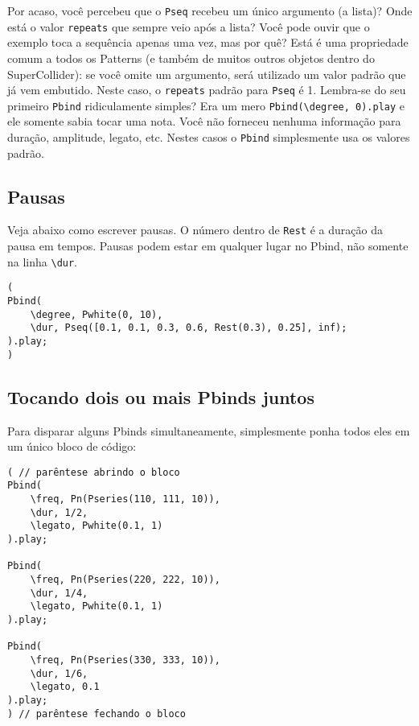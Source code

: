 Por acaso, você percebeu que o \texttt{Pseq} recebeu um único argumento (a lista)? Onde está o valor \texttt{repeats} que sempre veio após a lista? Você pode ouvir que o exemplo toca a sequência apenas uma vez, mas por quê? Está é uma propriedade comum a todos os Patterns (e também de muitos outros objetos dentro do SuperCollider): se você omite um argumento, será utilizado um valor padrão que já vem embutido. Neste caso, o \texttt{repeats} padrão para \texttt{Pseq} é 1. Lembra-se do seu primeiro \texttt{Pbind} ridiculamente simples? Era um mero \texttt{Pbind(\textbackslash degree, 0).play} e ele somente sabia tocar uma nota. Você não forneceu nenhuma informação para duração, amplitude, legato, etc. Nestes casos o \texttt{Pbind} simplesmente usa os valores padrão.


\subsection{Pausas}

Veja abaixo como escrever pausas. O número dentro de \texttt{Rest} é a duração da pausa em tempos. Pausas podem estar em qualquer lugar no Pbind, não somente na linha \texttt{\textbackslash dur}.

 
\begin{lstlisting}[style=SuperCollider-IDE, basicstyle=\scttfamily\footnotesize]
(
Pbind(
	\degree, Pwhite(0, 10),
	\dur, Pseq([0.1, 0.1, 0.3, 0.6, Rest(0.3), 0.25], inf);
).play;
)
\end{lstlisting}
 

\subsection{Tocando dois ou mais Pbinds juntos}

Para disparar alguns Pbinds simultaneamente, simplesmente ponha todos eles em um único bloco de código:
 
\begin{lstlisting}[style=SuperCollider-IDE, basicstyle=\scttfamily\footnotesize]
( // parêntese abrindo o bloco
Pbind(
	\freq, Pn(Pseries(110, 111, 10)),
	\dur, 1/2,
	\legato, Pwhite(0.1, 1)
).play;

Pbind(
	\freq, Pn(Pseries(220, 222, 10)),
	\dur, 1/4,
	\legato, Pwhite(0.1, 1)
).play;

Pbind(
	\freq, Pn(Pseries(330, 333, 10)),
	\dur, 1/6,
	\legato, 0.1
).play;
) // parêntese fechando o bloco
\end{lstlisting}

